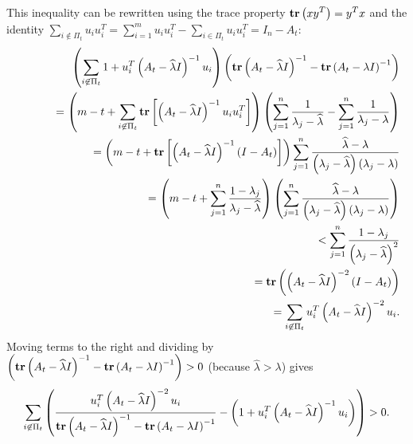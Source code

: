 \documentclass[final,leqno,onefignum,onetabnum]{siamltex1213}
\begin{document}
This inequality can be rewritten using the trace property $\displaystyle \text{\bf tr}\left(xy^T\right)=y^Tx$ and the identity $\displaystyle \sum_{i\notin \Pi_t} u_iu_i^T=\sum_{i=1}^{m} u_iu_i^T - \sum_{i\in \Pi_t} u_iu_i^T = I_n-A_t$:
\footnotesize
\begin{eqnarray*}
&& {\displaystyle \left(\sum_{i\not\in \Pi_t} 1+u_i^T\left(A_t-\widehat{\lambda}I\right)^{-1}u_i\right)\left(\text{\bf tr}\left(A_t-\widehat{\lambda}I\right)^{-1}-\text{\bf tr}\left(A_t-\lambda I\right)^{-1}\right)} \\
&&{\displaystyle   \hspace{1cm} = \left(m-t+\sum_{i\not\in \Pi_t}\text{\bf tr}\left[\left(A_t-\widehat{\lambda}I\right)^{-1}u_iu_i^T\right]\right)\left(\sum_{j=1}^n\frac{1}{\lambda_j-\widehat{\lambda}}-\sum_{j=1}^n\frac{1}{\lambda_j-\lambda}\right) }\\
&&{\displaystyle   \hspace{1cm} = \left(m-t+\text{\bf tr}\left[\left(A_t-\widehat{\lambda}I\right)^{-1}\left(I-A_t\right)\right]\right)\sum_{j=1}^n\frac{\widehat{\lambda}-\lambda}{\left(\lambda_j-\widehat{\lambda}\right)\left(\lambda_j-\lambda\right)} }\\
&&{\displaystyle   \hspace{1cm} = \left(m-t+\sum_{j=1}^n\frac{1-\lambda_j}{\lambda_j-\widehat{\lambda}}\right)\left(\sum_{j=1}^n\frac{\widehat{\lambda}-\lambda}{\left(\lambda_j-\widehat{\lambda}\right)\left(\lambda_j-\lambda\right)}\right)} \\
&& {\displaystyle  \hspace{1cm} < \sum_{j=1}^n\frac{1-\lambda_j}{\left(\lambda_j-\widehat{\lambda}\right)^2}}\\
&& {\displaystyle  \hspace{1cm} = \text{\bf tr}\left(\left(A_t-\widehat{\lambda}I\right)^{-2}\left(I-A_t\right)\right)}\\
&& {\displaystyle  \hspace{1cm} =  \sum_{i\not\in \Pi_t}u_i^T\left(A_t-\widehat{\lambda}I\right)^{-2}u_i.}
\end{eqnarray*}
\normalsize
Moving terms to the right and dividing by ${\displaystyle  \left(\text{\bf tr}\left(A_t-\widehat{\lambda}I\right)^{-1}-\text{\bf tr}\left(A_t-\lambda I\right)^{-1}\right) > 0}$ (because $\widehat{\lambda}>\lambda$)  gives
\[{\displaystyle  \sum_{i\not\in \Pi_t}\left(\frac{u_i^T\left(A_t-\widehat{\lambda}I\right)^{-2}u_i}{\text{\bf tr}\left(A_t-\widehat{\lambda}I\right)^{-1}-\text{\bf tr}\left(A_t-\lambda I\right)^{-1}}-\left(1+u_i^T\left(A_t-\widehat{\lambda}I\right)^{-1}u_i\right)\right) > 0.} \]
\end{document}
